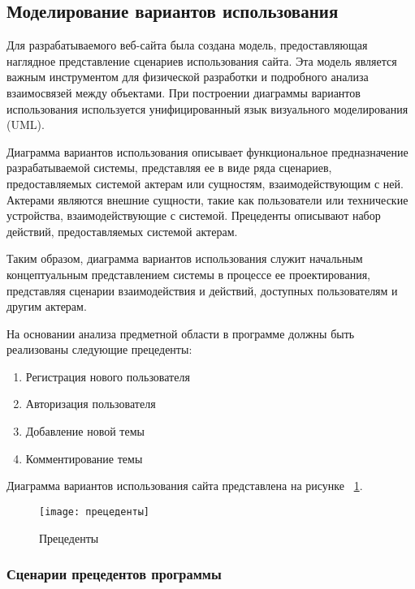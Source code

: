 \subsection{Моделирование вариантов использования}

Для разрабатываемого веб-сайта была создана модель, предоставляющая наглядное представление сценариев использования сайта. Эта модель является важным инструментом для физической разработки и подробного анализа взаимосвязей между объектами. При построении диаграммы вариантов использования используется унифицированный язык визуального моделирования (UML).

Диаграмма вариантов использования описывает функциональное предназначение разрабатываемой системы, представляя ее в виде ряда сценариев, предоставляемых системой актерам или сущностям, взаимодействующим с ней. Актерами являются внешние сущности, такие как пользователи или технические устройства, взаимодействующие с системой. Прецеденты описывают набор действий, предоставляемых системой актерам.

Таким образом, диаграмма вариантов использования служит начальным концептуальным представлением системы в процессе ее проектирования, представляя сценарии взаимодействия и действий, доступных пользователям и другим актерам.

На основании анализа предметной области в программе должны быть реализованы следующие прецеденты:
\begin{enumerate}
\item Регистрация нового пользователя
\item Авторизация пользователя
\item Добавление новой темы
\item Комментирование темы
\end{enumerate}

Диаграмма вариантов использования сайта представлена на рисунке 
~\ref{прецеденты:image}.

\begin{figure}[ht]
	\texttt{[image: прецеденты]}
	\caption{Прецеденты}
	\label{прецеденты:image}
\end{figure}

\subsubsection{Сценарии прецедентов программы}

